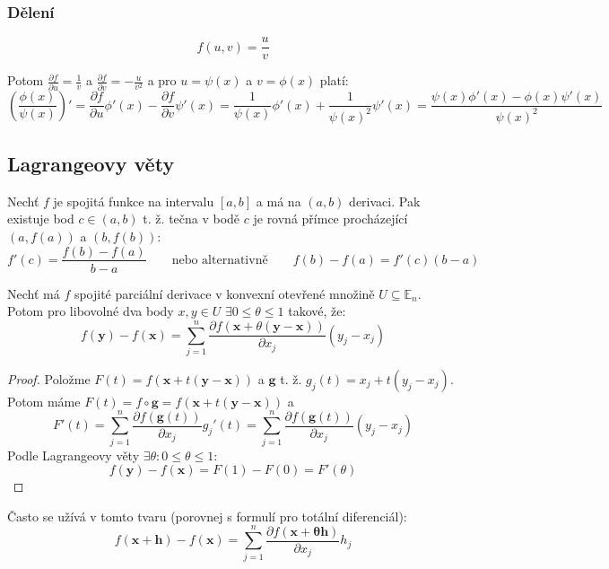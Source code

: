 \documentclass[../main.tex]{subfiles}
\begin{document}
\subsubsection{Dělení}
\[ f(u,v) = \frac{u}{v} \]

Potom $ \frac{\partial f}{\partial u} = \frac{1}{v} $ a $ \frac{\partial f}{\partial v} = -\frac{u}{v^2} $
a pro $u = \psi (x)$ a $ v = \phi (x) $ platí:
\[ \left( \frac{\phi (x)}{\psi (x)} \right)' =
\frac{\partial f}{\partial u} \phi '(x) - \frac{\partial f}{\partial v} \psi '(x) =
\frac{1}{\psi (x)} \phi '(x) + \frac{1}{\psi (x)^2}\psi '(x) =
\frac{\psi (x)\phi '(x) - \phi (x)\psi '(x)}{\psi (x)^2} \]

\subsection{Lagrangeovy věty}
\begin{theorem}
	Nechť $f$ je spojitá funkce na intervalu $[a, b]$ a má na $(a, b)$ derivaci. Pak existuje bod $c \in (a, b)$ t. ž. tečna v bodě $c$ je rovná přímce procházející $(a, f(a))$ a $(b, f(b))$: $$f'(c) = \frac{f(b) - f(a)}{b - a} \qquad \text{nebo alternativně} \qquad f(b) - f(a) = f'(c)(b - a)$$
\end{theorem}

\begin{theorem} \label{lagrange1}
	Nechť má $f$ spojité parciální derivace v konvexní otevřené množině $U \subseteq \mathbb{E}_{n}$.
	Potom pro libovolné dva body $x,y \in U$ $\exists 0 \leq \theta \leq 1$ takové, že:
	\[ f(\mathbf{y}) - f(\mathbf{x}) =
	\sum^{n}_{j=1} \frac{\partial f(\mathbf{x} + \theta (\mathbf{y}-\mathbf{x}))}{\partial x_j}(y_j - x_j) \]
\end{theorem}

\begin{proof}
	Položme $F(t) = f(\mathbf{x} + t(\mathbf{y} - \mathbf{x}))$ a $\mathbf{g}$ t. ž. $g_j(t) = x_j + t(y_j - x_j)$.
	Potom máme $F(t) = f \circ \mathbf{g} = f(\mathbf{x} + t(\mathbf{y}-\mathbf{x}))$ a
	\[ F'(t) = \sum^{n}_{j=1} \frac{\partial f(\mathbf{g}(t))}{\partial x_j}g_j'(t) =
	\sum^{n}_{j=1} \frac{\partial f(\mathbf{g}(t))}{\partial x_j}(y_j - x_j)  \]
	Podle Lagrangeovy věty $\exists \theta : 0 \leq \theta \leq 1$:
	\[ f(\mathbf{y}) - f(\mathbf{x}) = F(1) - F(0) = F'(\theta) \]
\end{proof}


\begin{remark}
	Často se užívá v tomto tvaru (porovnej s formulí pro totální diferenciál):
	\[ f(\mathbf{x} + \mathbf{h}) - f(\mathbf{x}) =
	\sum^{n}_{j=1} \frac{\partial f(\mathbf{x + \theta \mathbf{h}})}{\partial x_j}h_j \]
\end{remark}
\end{document}
